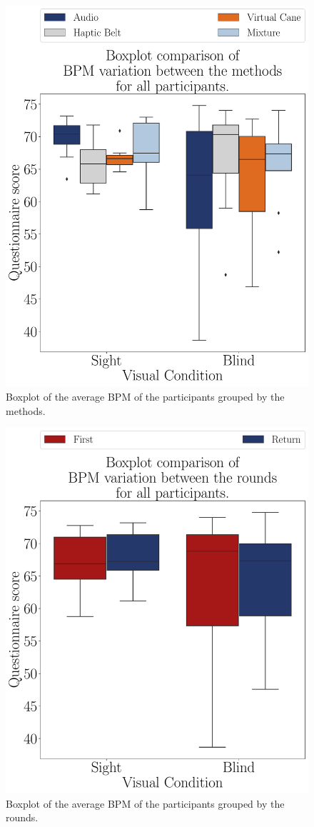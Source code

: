 \begin{figure}[!htb]
    \centering
    \includegraphics[width = 0.75\linewidth]{3 - Resultados/Figuras/boxplot_ecg_bpm_4_scene.pdf}
    \caption{Boxplot of the average BPM of the participants grouped by the methods.}
    \label{fig:boxplot_ecg_bpm_4_scene}
\end{figure}
\begin{figure}[!htb]
    \centering
    \includegraphics[width = 0.75\linewidth]{3 - Resultados/Figuras/boxplot_ecg_bpm_4_rounds.pdf}
    \caption{Boxplot of the average BPM of the participants grouped by the rounds.}
    \label{fig:boxplot_ecg_bpm_4_rounds}
\end{figure}

